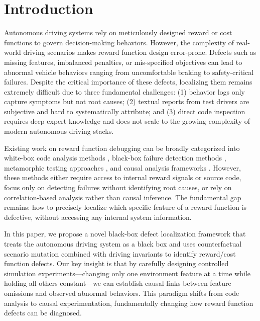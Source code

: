 \documentclass[conference]{IEEEtran}
\theoremstyle{plain}
\begin{document}
\section{Introduction}
\label{sec:intro}
Autonomous driving systems rely on meticulously designed reward or cost functions to govern decision-making behaviors. However, the complexity of real-world driving scenarios makes reward function design error-prone. Defects such as missing features, imbalanced penalties, or mis-specified objectives can lead to abnormal vehicle behaviors ranging from uncomfortable braking to safety-critical failures. Despite the critical importance of these defects, localizing them remains extremely difficult due to three fundamental challenges: (1) behavior logs only capture symptoms but not root causes; (2) textual reports from test drivers are subjective and hard to systematically attribute; and (3) direct code inspection requires deep expert knowledge and does not scale to the growing complexity of modern autonomous driving stacks.

Existing work on reward function debugging can be broadly categorized into white-box code analysis methods \cite{knox2023reward}, black-box failure detection methods \cite{remav2024}, metamorphic testing approaches \cite{deng2023rmt}, and causal analysis frameworks \cite{wan2024dvca}. However, these methods either require access to internal reward signals or source code, focus only on detecting failures without identifying root causes, or rely on correlation-based analysis rather than causal inference. The fundamental gap remains: how to precisely localize which specific feature of a reward function is defective, without accessing any internal system information.

In this paper, we propose a novel black-box defect localization framework that treats the autonomous driving system as a black box and uses counterfactual scenario mutation combined with driving invariants to identify reward/cost function defects. Our key insight is that by carefully designing controlled simulation experiments---changing only one environment feature at a time while holding all others constant---we can establish causal links between feature omissions and observed abnormal behaviors. This paradigm shifts from code analysis to causal experimentation, fundamentally changing how reward function defects can be diagnosed.
\end{document}
